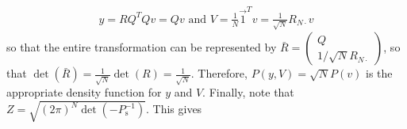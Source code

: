 \documentclass{article}
\begin{document}
\begin{align*}
y=RQ^TQv=Qv \text{ and } V=\frac{1}{N}\vec{1}^Tv=\frac{1}{\sqrt{N}}R_{N\cdot }v
\end{align*}
so that the entire transformation can be represented by $\bar{R}=\left(\begin{array}{cc}Q \\1/\sqrt{N}R_{N\cdot }\end{array}\right)$, so that $\det(\bar{R})=\frac{1}{\sqrt{N}}\det(R)=\frac{1}{\sqrt{N}}$. Therefore, $P(y,V)=\sqrt{N}P(v)$ is the appropriate density function for $y$ and $V$. Finally, note that $Z=\sqrt{(2\pi)^N\det(-P_\text{s}^{-1})}$. This gives


\end{document}
